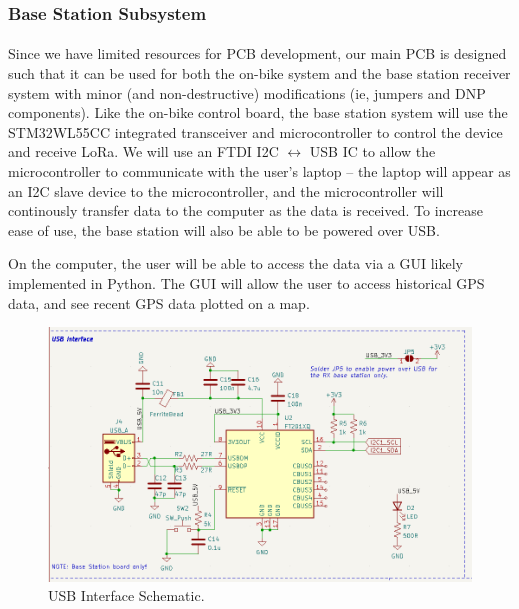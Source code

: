\documentclass{article}
\begin{document}
\subsubsection{Base Station Subsystem} 

\paragraph{} 
Since we have limited resources for PCB development, our main PCB is designed such that it can be used for both the on-bike system and the base station receiver system with minor (and non-destructive) modifications (ie, jumpers and DNP components). Like the on-bike control board, the base station system will use the STM32WL55CC integrated transceiver and microcontroller to control the device and receive LoRa. We will use an FTDI I2C $\leftrightarrow$ USB IC to allow the microcontroller to communicate with the user's laptop -- the laptop will appear as an I2C slave device to the microcontroller, and the microcontroller will continously transfer data to the computer as the data is received. To increase ease of use, the base station will also be able to be powered over USB. 

On the computer, the user will be able to access the data via a GUI likely implemented in Python. The GUI will allow the user to access historical GPS data, and see recent GPS data plotted on a map. 

\begin{center}
	\begin{figure}[H]
		\centering
		\includegraphics[width= \textwidth]{usb_interface.png}
		\caption{USB Interface Schematic.} \label{i2c_usb}
	\end{figure}
\end{center}
\end{document}
